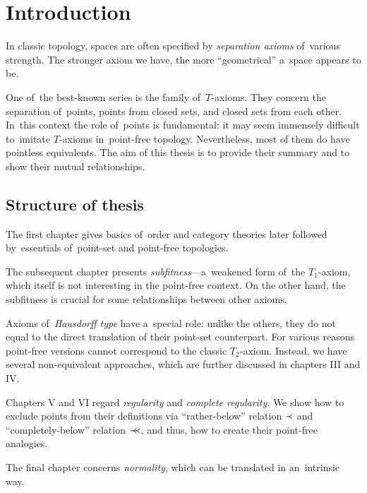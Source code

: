 \chapter*{Introduction}

In classic topology, spaces are often specified by \emph{separation axioms\/}
of~various strength.
The stronger axiom we have, the more ``geometrical'' a~space appears to be.

One of~the best-known series is the family of~$T$-axioms.
They concern the separation of~points, points from closed sets, and closed sets
from each other.
In~this context the role of~points is fundamental:
it may seem immensely difficult to~imitate $T$-axioms in~point-free topology.
Nevertheless, most of them do have pointless equivalents.
The aim of this thesis is to provide their summary and to show their mutual
relationships.

\section*{Structure of thesis}

The first chapter gives basics of~order and category theories later followed
by~essentials of~point-set and point-free topologies.

The subsequent chapter presents \emph{subfitness\/}---a~weakened form of~the
$T_1$-axiom, which itself is not interesting in the point-free context.
On the other hand, the subfitness is crucial for some relationships between
other axioms.

Axioms of~\emph{Hausdorff type\/} have a~special role:
unlike the others, they do not equal to the direct translation of their
point-set counterpart.
For various reasons point-free versions cannot correspond to the classic
$T_2$-axiom.
Instead, we have several non-equivalent approaches, which are further discussed
in chapters III and IV.

Chapters V and VI regard \emph{regularity\/} and \emph{complete regularity\/}.
We show how to exclude points from their definitions via ``rather-below''
relation $\prec$ and ``completely-below'' relation $\prec\mkern-8mu\prec$, and thus, how to create
their point-free analogies.

The final chapter concerns \emph{normality\/}, which can be translated in
an~intrinsic way.
